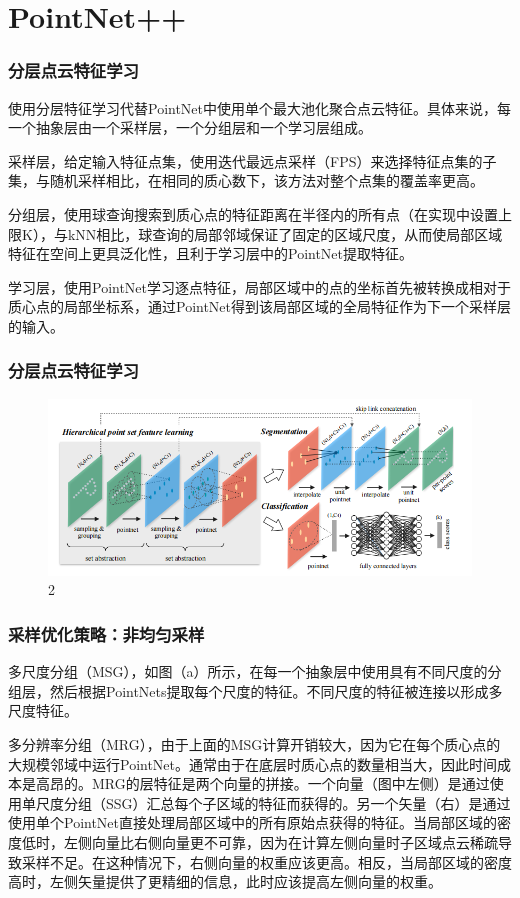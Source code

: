 \section{PointNet++}


\begin{frame}
\frametitle{分层点云特征学习}
    
使用分层特征学习代替PointNet中使用单个最大池化聚合点云特征。具体来说，每一个抽象层由一个采样层，一个分组层和一个学习层组成。

采样层，给定输入特征点集，使用迭代最远点采样（FPS）来选择特征点集的子集，与随机采样相比，在相同的质心数下，该方法对整个点集的覆盖率更高。

分组层，使用球查询搜索到质心点的特征距离在半径内的所有点（在实现中设置上限K），与kNN相比，球查询的局部邻域保证了固定的区域尺度，从而使局部区域特征在空间上更具泛化性，且利于学习层中的PointNet提取特征。

学习层，使用PointNet学习逐点特征，局部区域中的点的坐标首先被转换成相对于质心点的局部坐标系，通过PointNet得到该局部区域的全局特征作为下一个采样层的输入。




\end{frame}


\begin{frame}
\frametitle{分层点云特征学习}

\begin{figure}
\includegraphics[scale=0.7]{doc/img/f2.png}
\caption{2}
\end{figure}
    
\end{frame}


\begin{frame}
\frametitle{采样优化策略：非均匀采样}

多尺度分组（MSG），如图（a）所示，在每一个抽象层中使用具有不同尺度的分组层，然后根据PointNets提取每个尺度的特征。不同尺度的特征被连接以形成多尺度特征。

多分辨率分组（MRG），由于上面的MSG计算开销较大，因为它在每个质心点的大规模邻域中运行PointNet。通常由于在底层时质心点的数量相当大，因此时间成本是高昂的。MRG的层特征是两个向量的拼接。一个向量（图中左侧）是通过使用单尺度分组（SSG）汇总每个子区域的特征而获得的。另一个矢量（右）是通过使用单个PointNet直接处理局部区域中的所有原始点获得的特征。当局部区域的密度低时，左侧向量比右侧向量更不可靠，因为在计算左侧向量时子区域点云稀疏导致采样不足。在这种情况下，右侧向量的权重应该更高。相反，当局部区域的密度高时，左侧矢量提供了更精细的信息，此时应该提高左侧向量的权重。

\end{frame}

